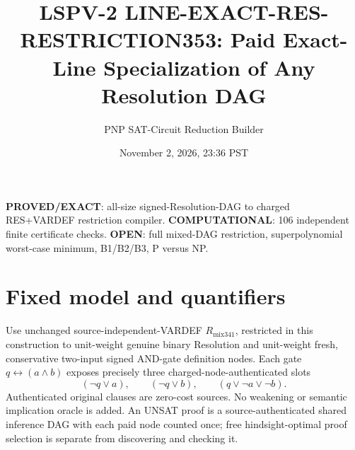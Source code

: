 \documentclass[11pt]{article}
\title{LSPV-2 LINE-EXACT-RES-RESTRICTION353: Paid Exact-Line Specialization of Any Resolution DAG}
\author{PNP SAT-Circuit Reduction Builder}
\date{November 2, 2026, 23:36 PST}
\begin{document}
\maketitle
\noindent\textbf{PROVED/EXACT}: all-size signed-Resolution-DAG to charged RES+VARDEF restriction compiler. \textbf{COMPUTATIONAL}: 106 independent finite certificate checks. \textbf{OPEN}: full mixed-DAG restriction, superpolynomial worst-case minimum, B1/B2/B3, P versus NP.

\section*{Fixed model and quantifiers}
Use unchanged source-independent-VARDEF $R_{\mathrm{mix341}}$, restricted in this construction to unit-weight genuine binary Resolution and unit-weight fresh, conservative two-input signed AND-gate definition nodes. Each gate $q\leftrightarrow(a\wedge b)$ exposes precisely three charged-node-authenticated slots
\[
(\neg q\vee a),\qquad(\neg q\vee b),\qquad(q\vee\neg a\vee\neg b).
\]
Authenticated original clauses are zero-cost sources. No weakening or semantic implication oracle is added. An UNSAT proof is a source-authenticated shared inference DAG with each paid node counted once; free hindsight-optimal proof selection is separate from discovering and checking it.
\end{document}
